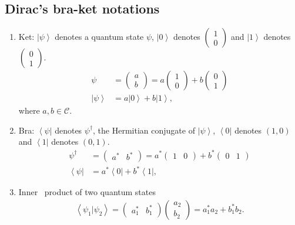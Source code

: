 \documentclass[onecolumn,pra,superscriptaddress,nofootinbib]{revtex4-1}
\newcommand{\bra}[1]{\mbox{$\left\langle #1 \right|$}}
\newcommand{\ket}[1]{\mbox{$\left| #1 \right\rangle$}}
\newcommand{\braket}[2]{\mbox{$\left\langle #1 | #2 \right\rangle$}}
\begin{document}
\subsection{Dirac's bra-ket notations}
\begin{enumerate}
\item
Ket: $\ket{\psi}$ denotes a quantum state $\psi$, $\ket{0}$ denotes $\begin{pmatrix}1\\0\end{pmatrix}$ and $\ket{1}$ denotes $\begin{pmatrix}0\\1\end{pmatrix}$.
\begin{equation} \label{ket}
\begin{aligned}
\psi &= \begin{pmatrix}a\\b\end{pmatrix}=a\begin{pmatrix}1\\0\end{pmatrix} + b\begin{pmatrix}0\\1\end{pmatrix} \\
\ket{\psi} &= a\ket{0}+b\ket{1},
\end{aligned}
\end{equation}
where $a, b\in\mathcal{C}$.

\item
Bra: $\bra{\psi}$ denotes $\psi^\dag$, the Hermitian conjugate of $\ket{\psi}$, $\bra{0}$ denotes $(1,0)$ and $\bra{1}$ denotes $(0,1)$.
\begin{equation} \label{bra}
\begin{aligned}
\psi^\dag &= \begin{pmatrix}a^* &b^*\end{pmatrix}=a^*\begin{pmatrix}1 &0\end{pmatrix}+b^*\begin{pmatrix}0 &1\end{pmatrix} \\
\bra{\psi} &= a^*\bra{0}+b^*\bra{1},
\end{aligned}
\end{equation}


\item
Inner~ product of two quantum states
\begin{equation} \label{inner product }
\begin{aligned}
\braket{\psi_1}{\psi_2}=\begin{pmatrix}a^*_1 &b^*_1\end{pmatrix} \begin{pmatrix}a_2\\b_2\end{pmatrix} =a^*_1a_2+b^*_1b_2.\\
\end{aligned}
\end{equation}
\end{enumerate}
\end{document}
